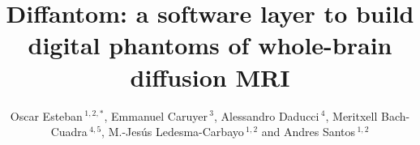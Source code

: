 \documentclass[english]{frontiers/frontiersSCNS} %
\def\firstAuthorLast{Esteban {et~al.}} %
\def\Authors{Oscar Esteban\,$^{1,2,*}$, Emmanuel Caruyer\,$^{3}$, Alessandro Daducci\,$^{4}$, Meritxell Bach-Cuadra\,$^{4,5}$,%
M.-Jes\'us Ledesma-Carbayo\,$^{1,2}$ and Andres Santos\,$^{1,2}$}
\begin{document}
\onecolumn
{}

\title[Diffantom]{Diffantom: a software layer to build digital phantoms of whole-brain diffusion MRI}

\author[\firstAuthorLast ]{\Authors} %
\address{} %
\correspondance{} %

\extraAuth{}%


\maketitle

\linenumbers
\end{document}

